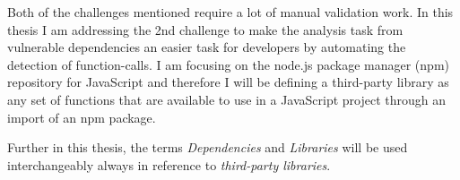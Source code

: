 
Both of the challenges mentioned require a lot of manual validation work. In this thesis I am addressing the 2nd challenge to make the analysis task from vulnerable dependencies an easier task for developers by automating the detection of function-calls. I am focusing on the node.js package manager (npm) repository for JavaScript and therefore I will be defining a third-party library as any set of functions that are available to use in a JavaScript project through an import of an npm package.  
 
Further in this thesis, the terms \textit{Dependencies} and \textit{Libraries} will be used interchangeably always in reference to \textit{third-party libraries}.